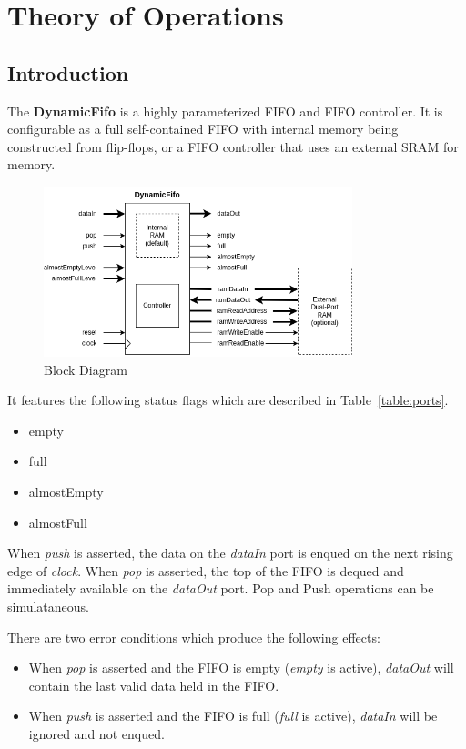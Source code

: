 \section{Theory of Operations}

\subsection{Introduction}
The \textbf{DynamicFifo} is a highly parameterized FIFO and FIFO controller. It
is configurable as a full self-contained FIFO with internal memory being
constructed from flip-flops, or a FIFO controller that uses an external SRAM
for memory.

\begin{figure}[h]
  \includegraphics[width=0.80\textwidth]{images/block-diagram.png}
  \caption{Block Diagram}\label{fig:block-diagram}
\end{figure}

It features the following status flags which are described in
Table~\ref{table:ports}.

\begin{itemize}[noitemsep]
  \item{empty}
  \item{full}
  \item{almostEmpty}
  \item{almostFull}
\end{itemize}

When \textit{push} is asserted, the data on the \textit{dataIn} port is enqued
on the next rising edge of \textit{clock}. When \textit{pop} is asserted, the
top of the FIFO is dequed and immediately available on the \textit{dataOut}
port. Pop and Push operations can be simulataneous.

There are two error conditions which produce the following effects:
\begin{itemize}
  \item{When \textit{pop} is asserted and the FIFO is empty (\textit{empty} is
        active), \textit{dataOut} will contain the last valid data held in
        the FIFO.}
  \item{When \textit{push} is asserted and the FIFO is full (\textit{full} is
        active), \textit{dataIn} will be ignored and not enqued.}
\end{itemize}

